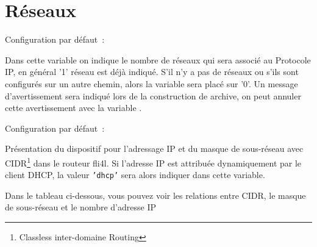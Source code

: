 
\section{Réseaux}

\begin{description}

  Configuration par défaut~: 

  {Dans cette variable on indique le nombre de réseaux qui sera associé au 
  Pro\-to\-cole IP, en général '1' réseau est déjà indiqué. S'il n'y a pas de
  réseaux ou s'ils sont configurés sur un autre chemin, alors la variable
   sera placé sur '0'. Un message d'avertissement sera indiqué
  lors de la construction de archive, on peut annuler cette avertissement avec
  la variable .}


  Configuration par défaut~: 

  {Présentation du dispositif pour l'adressage IP et du masque de sous-réseau
  avec CIDR\footnote{Classless inter-domaine Routing} dans le routeur fli4l. Si
  l'adresse IP est attribuée dynamiquement par le client DHCP, la valeur \texttt{'dhcp'}
  sera alors indiquer dans cette variable.

  Dans le tableau ci-dessous, vous pouvez voir les relations entre CIDR, le masque
  de sous-réseau et le nombre d'adresse IP


}
\end{description}
